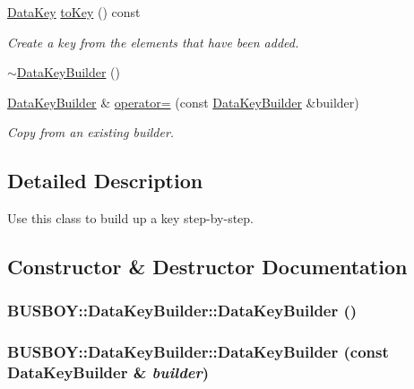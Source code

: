 \begin{DoxyCompactItemize}
\hyperlink{classBUSBOY_1_1DataKey}{DataKey} \hyperlink{classBUSBOY_1_1DataKeyBuilder_ab1f70cd319860cca1bc8ec29726fdf2d}{toKey} () const 
\begin{DoxyCompactList}\small\item\em Create a key from the elements that have been added. \item\end{DoxyCompactList}\item 
\hyperlink{classBUSBOY_1_1DataKeyBuilder_aac6b7ac4f8e5d2ac37440d0dddbbdc6a}{$\sim$DataKeyBuilder} ()
\item 
\hyperlink{classBUSBOY_1_1DataKeyBuilder}{DataKeyBuilder} \& \hyperlink{classBUSBOY_1_1DataKeyBuilder_a70b9d0de3fbfb9140c79b53335e9bcde}{operator=} (const \hyperlink{classBUSBOY_1_1DataKeyBuilder}{DataKeyBuilder} \&builder)
\begin{DoxyCompactList}\small\item\em Copy from an existing builder. \item\end{DoxyCompactList}\end{DoxyCompactItemize}


\subsection{Detailed Description}
Use this class to build up a key step-\/by-\/step. 

\subsection{Constructor \& Destructor Documentation}
\hypertarget{classBUSBOY_1_1DataKeyBuilder_a9a682e24401e974b9685b24bec544743}{
\subsubsection[{DataKeyBuilder}]{\setlength{\rightskip}{0pt plus 5cm}BUSBOY::DataKeyBuilder::DataKeyBuilder ()}}
\label{classBUSBOY_1_1DataKeyBuilder_a9a682e24401e974b9685b24bec544743}
\hypertarget{classBUSBOY_1_1DataKeyBuilder_a130457a8984380314e2866d6c65f2e33}{
\subsubsection[{DataKeyBuilder}]{\setlength{\rightskip}{0pt plus 5cm}BUSBOY::DataKeyBuilder::DataKeyBuilder (const {\bf DataKeyBuilder} \& {\em builder})}}
\label{classBUSBOY_1_1DataKeyBuilder_a130457a8984380314e2866d6c65f2e33}


